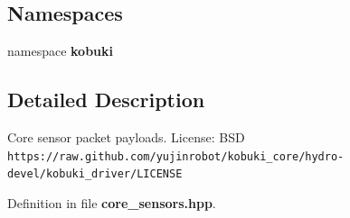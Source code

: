 \subsection*{\-Namespaces}
\begin{DoxyCompactItemize}
\item 
namespace {\bf kobuki}
\end{DoxyCompactItemize}


\subsection{\-Detailed \-Description}
\-Core sensor packet payloads. \-License\-: \-B\-S\-D {\tt https\-://raw.\-github.\-com/yujinrobot/kobuki\-\_\-core/hydro-\/devel/kobuki\-\_\-driver/\-L\-I\-C\-E\-N\-S\-E} 

\-Definition in file {\bf core\-\_\-sensors.\-hpp}.

